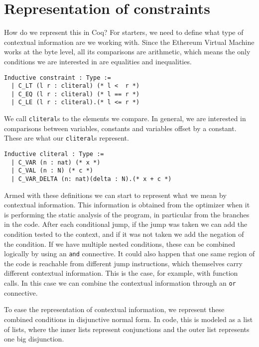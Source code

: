 \section{Representation of constraints}

How do we represent this in Coq? For starters, we need to define what type of contextual information
are we working with. Since the Ethereum Virtual Machine works at the byte level, all its comparisons
are arithmetic, which means the only conditions we are interested in are equalities and inequalities.

\begin{verbatim}
Inductive constraint : Type :=
  | C_LT (l r : cliteral) (* l <  r *)
  | C_EQ (l r : cliteral) (* l == r *)
  | C_LE (l r : cliteral).(* l <= r *)
\end{verbatim}

We call \texttt{cliteral}s to the elements we compare. In general, we are interested in 
comparisons between variables, constants and variables offset by a constant. These are what our 
\texttt{cliteral}s represent.

\begin{verbatim}
Inductive cliteral : Type :=
  | C_VAR (n : nat) (* x *)
  | C_VAL (n : N) (* c *)
  | C_VAR_DELTA (n: nat)(delta : N).(* x + c *)
\end{verbatim}

Armed with these definitions we can start to represent what we mean by contextual information. This 
information is obtained from the optimizer when it is performing the static analysis of the program, 
in particular from the branches in the code. After each conditional jump, if the jump was taken we 
can add the condition tested to the context, and if it was not taken we add the negation of the 
condition. If we have multiple nested conditions, these can be combined logically by using an 
\texttt{and} connective. It could also happen that one same region of the code is reachable 
from different jump instructions, which themselves carry different contextual information. This is the 
case, for example, with function calls. In this case we can combine the contextual information through 
an \texttt{or} connective. 

To ease the representation of contextual information, we represent these combined conditions in 
disjunctive normal form. In code, this is modeled as a list of lists, where the inner lists represent 
conjunctions and the outer list represents one big disjunction.

